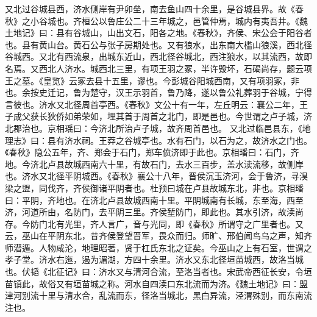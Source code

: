 \documentclass[12pt,UTF8]{ctexbook}
\begin{document}
又北过谷城县西，济水侧岸有尹卯垒，南去鱼山四十余里，是谷城县界。故《春秋》之小谷城也。齐桓公以鲁庄公二十三年城之，邑管仲焉，城内有夷吾井。《魏土地记》曰：县有谷城山，山出文石，阳各之地。《春秋》，齐侯、宋公会于阳谷者也。县有黄山台。黄石公与张子房期处也。又有狼水，出东南大槛山狼溪，西北径谷城西。又北有西流泉，出城东近山，西北径谷城北，西注狼水，以其流西，故即名焉。又西北人济水。城西北三里，有项王羽之冢，半许毁坏，石碣尚存，题云项王之墓。《皇览》云冢去县十五里，谬也。今彭城谷阳城西南，又有项羽冢，非也。余按史迁记，鲁为楚守，汉王示羽首，鲁乃降，遂以鲁公礼葬羽于谷城，宁得言彼也。济水又北径周首亭西。《春秋》文公十有一年，左丘明云：襄公二年，王子成父获长狄侨如弟荣如，埋其首于周首之北门，即是邑也。今世谓之卢子城，济北郡治也。京相瑶曰：今济北所治卢子城，故齐周首邑也。
又北过临邑县东，《地理志》曰：县有济水祠。王莽之谷城亭也。水有石门，以石为之，故济水之门也。《春秋》隐公五年，齐、郑会于石门，郑车偾济即于此也。京相璠曰：石门，齐地。今济北卢县故城西南六十里，有故石门，去水三百步，盖水渎流移，故侧岸也。济水又北径平阴城西。《春秋》襄公十八年，晋侯沉玉济河，会于鲁济，寻湨梁之盟，同伐齐，齐侯御诸平阴者也。杜预曰城在卢县故城东北，非也。京相璠曰：平阴，齐地也。在济北卢县故城西南十里。平阴城南有长城，东至海，西至济，河道所由，名防门，去平阴三里。齐侯堑防门，即此也。其水引济，故渎尚存。今防门北有光里，齐人言广，音与光同，即《春秋》所谓守之广里者也。又云，巫山在平阴东北，昔齐侯登望晋军，畏众而归。师旷、邢伯闻鸟乌之声，知齐师潜遁。人物咸沦，地理昭著，贤于杠氏东北之证矣。今巫山之上有石室，世谓之孝子堂。济水右迤，遏为湄湖，方四十余里。济水又东北径垣苗城西，故洛当城也。伏韬《北征记》曰：济水又与清河合流，至洛当者也。宋武帝西征长安，令垣苗镇此，故俗又有垣苗城之称。河水自四渎口东北流而为济。《魏土地记》曰：盟津河别流十里与清水合，乱流而东，径洛当城北，黑白异流，泾渭殊别，而东南流注也。
\end{document}
